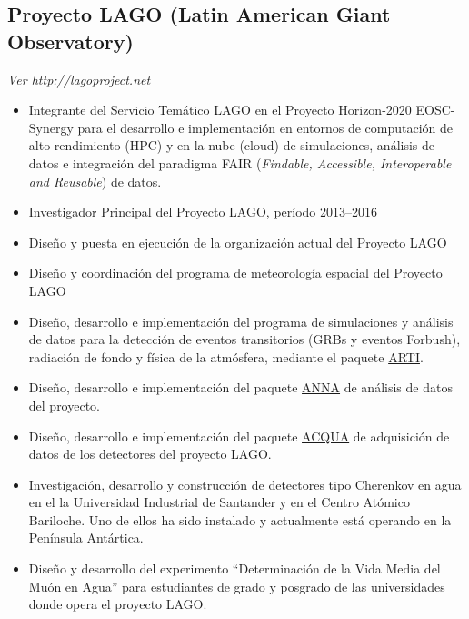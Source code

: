\subsection*{Proyecto LAGO (Latin American Giant Observatory)}
{\small{\textit{Ver \href{http://lagoproject.net}{http://lagoproject.net}}}}
\begin{itemize}
\item Integrante del Servicio Temático LAGO en el Proyecto Horizon-2020 EOSC-Synergy para el desarrollo e implementación en entornos de computación de alto rendimiento (HPC) y en la nube (cloud) de simulaciones, análisis de datos e integración del paradigma FAIR (\emph{Findable, Accessible, Interoperable and Reusable}) de datos.
\item Investigador Principal del Proyecto LAGO, período 2013--2016
\item Diseño y puesta en ejecución de la organización actual del Proyecto LAGO
\item Diseño y coordinación del programa de meteorología espacial del Proyecto LAGO
\item Diseño, desarrollo e implementación del programa de simulaciones y análisis de datos para la detección de eventos transitorios (GRBs y eventos Forbush), radiación de fondo y física de la atmósfera, mediante el paquete \href{https://github.com/lagoproject/arti}{ARTI}.
\item Diseño, desarrollo e implementación del paquete \href{https://github.com/lagoproject/anna}{ANNA} de análisis de datos del proyecto.
\item Diseño, desarrollo e implementación del paquete \href{https://github.com/lagoproject/acqua}{ACQUA} de adquisición de datos de los detectores del proyecto LAGO.
\item Investigación, desarrollo y construcción de detectores tipo Cherenkov en agua en el la Universidad Industrial de Santander y en el Centro Atómico Bariloche.
Uno de ellos ha sido instalado y actualmente está operando en la Península Antártica.
\item Diseño y desarrollo del experimento ``Determinación de la Vida Media del Muón en Agua'' para estudiantes de grado y posgrado de las universidades donde opera el proyecto LAGO\@.
\end{itemize}

